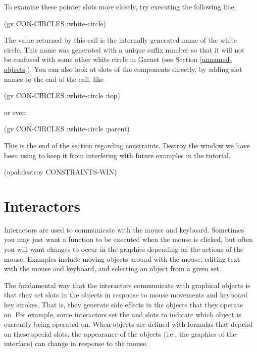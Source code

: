 To examine these pointer slots more closely, try executing the
following line.

\begin{programexample}
(gv CON-CIRCLES :white-circle)
\end{programexample}

The value returned by this  call is the internally
generated name of the white circle.  This name was generated with a
unique suffix number so that it will not be confused with some other
white circle in Garnet (see Section \ref{unnamed-objects}).  You can
also look at slots of the components directly, by adding slot names to
the end of the  call, like

\begin{programexample}
(gv CON-CIRCLES :white-circle :top)
\end{programexample}

or even

\begin{programexample}
(gv CON-CIRCLES :white-circle :parent)
\end{programexample}

This is the end of the section regarding constraints.  Destroy the window
we have been using to keep it from interfering with future examples in
the tutorial.

\begin{programexample}
(opal:destroy CONSTRAINTS-WIN)
\end{programexample}



\chapter{Interactors}
\label{interactors}

Interactors are used to communicate with the mouse and keyboard.
Sometimes you may just want a function to be executed when the mouse
is clicked, but often you will want changes to occur in the graphics
depending on the actions of the mouse.  Examples include moving
objects around with the mouse, editing text with the mouse and
keyboard, and selecting an object from a given set.

The fundamental way that the interactors communicate with graphical
objects is that they set slots in the objects in response to mouse
movements and keyboard key strokes.  That is, they generate side
effects in the objects that they operate on.  For example, some interactors
set the  and  slots to indicate which
object is currently being operated on.  When objects are defined with
formulas that depend on these special slots, the appearance of the
objects (i.e., the graphics of the interface) can change in response
to the mouse.

